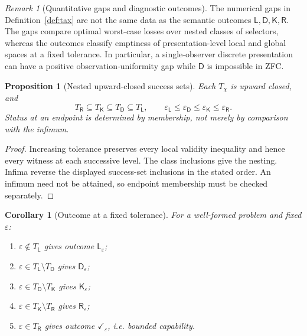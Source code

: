 \documentclass[11pt]{article}
\theoremstyle{plain}
\newtheorem{proposition}[theorem]{Proposition}
\newtheorem{corollary}[theorem]{Corollary}
\theoremstyle{definition}
\theoremstyle{remark}
\newtheorem{remark}[theorem]{Remark}
\newcommand{\eps}{\varepsilon}
\begin{document}
\begin{remark}[Quantitative gaps and diagnostic outcomes]
The numerical gaps in Definition~\ref{def:tax} are not the same data as the
semantic outcomes $\mathsf L,\mathsf D,\mathsf K,\mathsf R$. The gaps compare
optimal worst-case losses over nested classes of selectors, whereas the outcomes
classify emptiness of presentation-level local and global spaces at a fixed
tolerance. In particular, a single-observer discrete presentation can have a
positive observation-uniformity gap while $\mathsf D$ is impossible in ZFC.
\end{remark}

\begin{proposition}[Nested upward-closed success sets]\label{prop:spectrum}
Each $T_\chi$ is upward closed, and
\[
T_{\mathsf R}\subseteq T_{\mathsf K}\subseteq
T_{\mathsf D}\subseteq T_{\mathsf L},
\qquad
\eps_{\mathsf L}\le\eps_{\mathsf D}\le
\eps_{\mathsf K}\le\eps_{\mathsf R}.
\]
Status at an endpoint is determined by membership, not merely by comparison with
the infimum.
\end{proposition}

\begin{proof}
Increasing tolerance preserves every local validity inequality and hence every
witness at each successive level. The class inclusions give the nesting. Infima
reverse the displayed success-set inclusions in the stated order. An infimum
need not be attained, so endpoint membership must be checked separately.
\end{proof}

\begin{corollary}[Outcome at a fixed tolerance]\label{cor:tolerance-outcome}
For a well-formed problem and fixed $\eps$:
\begin{enumerate}[label=(\roman*)]
\item $\eps\notin T_{\mathsf L}$ gives outcome $\mathsf L_\eps$;
\item $\eps\in T_{\mathsf L}\setminus T_{\mathsf D}$ gives $\mathsf D_\eps$;
\item $\eps\in T_{\mathsf D}\setminus T_{\mathsf K}$ gives $\mathsf K_\eps$;
\item $\eps\in T_{\mathsf K}\setminus T_{\mathsf R}$ gives $\mathsf R_\eps$;
\item $\eps\in T_{\mathsf R}$ gives outcome $\checkmark_\eps$, i.e. bounded capability.
\end{enumerate}
\end{corollary}
\end{document}
